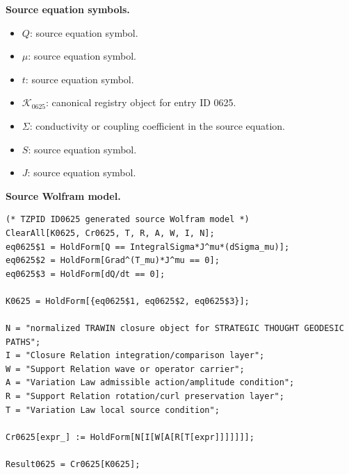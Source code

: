 \begin{minipage}[t]{0.49\linewidth}
\begingroup
\small
\raggedright
\textbf{Source equation symbols.}\par
\begin{itemize}[leftmargin=1.35em,itemsep=1pt,topsep=1pt,parsep=0pt]
    \item $Q$: source equation symbol.
    \item $\mu$: source equation symbol.
    \item $t$: source equation symbol.
    \item $\mathcal{K}_{0625}$: canonical registry object for entry ID 0625.
    \item $\Sigma$: conductivity or coupling coefficient in the source equation.
    \item $S$: source equation symbol.
    \item $J$: source equation symbol.
\end{itemize}
\endgroup
\end{minipage}\hfill
\begin{minipage}[t]{0.47\linewidth}
\begingroup
\scriptsize
\raggedright
\textbf{Source Wolfram model.}\par
\begin{Verbatim}[fontsize=\tiny,breaklines=true,breakanywhere=true]
(* TZPID ID0625 generated source Wolfram model *)
ClearAll[K0625, Cr0625, T, R, A, W, I, N];
eq0625$1 = HoldForm[Q == IntegralSigma*J^mu*(dSigma_mu)];
eq0625$2 = HoldForm[Grad^(T_mu)*J^mu == 0];
eq0625$3 = HoldForm[dQ/dt == 0];

K0625 = HoldForm[{eq0625$1, eq0625$2, eq0625$3}];

N = "normalized TRAWIN closure object for STRATEGIC THOUGHT GEODESIC PATHS";
I = "Closure Relation integration/comparison layer";
W = "Support Relation wave or operator carrier";
A = "Variation Law admissible action/amplitude condition";
R = "Support Relation rotation/curl preservation layer";
T = "Variation Law local source condition";

Cr0625[expr_] := HoldForm[N[I[W[A[R[T[expr]]]]]]];

Result0625 = Cr0625[K0625];
\end{Verbatim}
\endgroup
\end{minipage}

